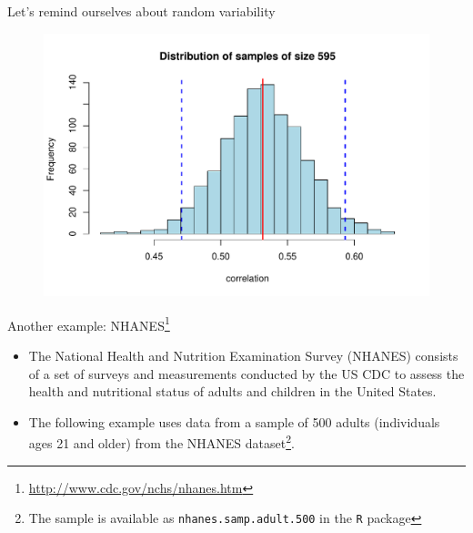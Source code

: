 \documentclass[10pt,handout]{beamer}\usepackage[]{graphicx}\usepackage[]{color}
\makeatletter
\def\maxwidth{ %
  \ifdim\Gin@nat@width>\linewidth
    \linewidth
  \else
    \Gin@nat@width
  \fi
}
\newenvironment{knitrout}{}{} %
\makeatother
\begin{document}
\begin{frame}[fragile]{Let's remind ourselves about random variability}
\begin{figure}
\begin{minipage}[h]{0.59\linewidth}
\begin{knitrout}
{\centering \includegraphics[width=\maxwidth]{figure/histboot-1} 

}



\end{knitrout}
	\end{minipage}
\end{figure}



\end{frame}



\begin{frame}{Another example: NHANES\footnote{\tiny{\url{http://www.cdc.gov/nchs/nhanes.htm}}}}
	\begin{itemize}
		\item The National Health and Nutrition Examination Survey (NHANES) consists of a set of surveys and measurements conducted by the US CDC to assess the health and nutritional status of adults	and children in the United States. 
		\item The following example uses data from a sample of 500 adults (individuals ages 21 and older) from the NHANES dataset\footnote{\tiny{The sample is available as \texttt{nhanes.samp.adult.500} in the \texttt{R}  package}}.
	\end{itemize}
\end{frame}
\end{document}

